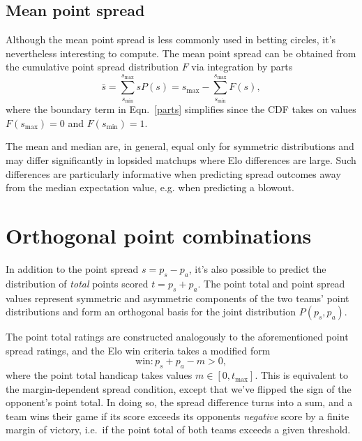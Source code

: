 \documentclass[aps,prc,reprint,amsmath,superscriptaddress]{revtex4-1}
\begin{document}
\subsection{Mean point spread}

Although the mean point spread is less commonly used in betting circles, it's nevertheless interesting to compute.
The mean point spread can be obtained from the cumulative point spread distribution $F$ via integration by parts
\begin{equation}
  \label{parts}
  \bar{s} = \sum\limits_{s_\text{min}}^{s_\text{max}} s P(s) = s_\text{max} - \sum\limits_{s_\text{min}}^{s_\text{max}} F(s),
\end{equation}
where the boundary term in Eqn.~\ref{parts} simplifies since the CDF takes on values $F(s_\text{max})=0$ and $F(s_\text{min})=1$.

The mean and median are, in general, equal only for symmetric distributions and may differ significantly in lopsided matchups where Elo differences are large.
Such differences are particularly informative when predicting spread outcomes away from the median expectation value, e.g. when predicting a blowout. 

\section{Orthogonal point combinations}

In addition to the point spread $s = p_s - p_a$, it's also possible to predict the distribution of \emph{total} points scored $t = p_s + p_a$.
The point total and point spread values represent symmetric and asymmetric components of the two teams' point distributions and form an orthogonal basis for the joint distribution $P(p_s, p_a)$. 

The point total ratings are constructed analogously to the aforementioned point spread ratings, and the Elo win criteria takes a modified form
\begin{equation}
  \label{win_total}
  \text{win}: p_s + p_a - m > 0,
\end{equation}
where the point total handicap takes values $m \in [0, t_\text{max}]$.
This is equivalent to the margin-dependent spread condition, except that we've flipped the sign of the opponent's point total.
In doing so, the spread difference turns into a sum, and a team wins their game if its score exceeds its opponents \emph{negative} score by a finite margin of victory, i.e.\ if the point total of both teams exceeds a given threshold.
\end{document}
